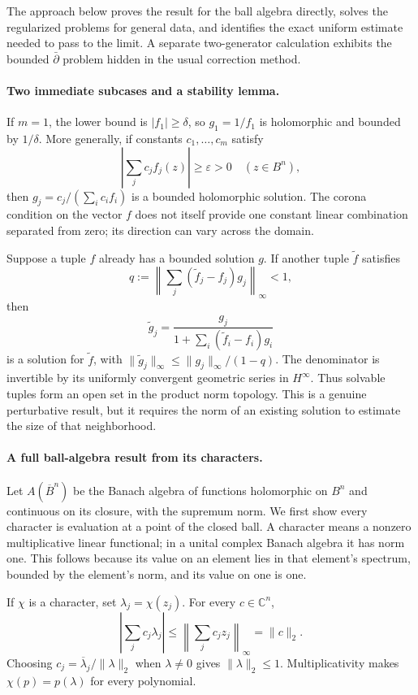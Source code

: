 \documentclass[11pt]{article}
\begin{document}
The approach below proves the result for the ball algebra directly,
solves the regularized problems for general data, and identifies
the exact uniform estimate needed to pass to the limit. A separate
two-generator calculation exhibits the bounded $\bar\partial$
problem hidden in the usual correction method.

\paragraph{Two immediate subcases and a stability lemma.}
If $m=1$, the lower bound is $|f_1|\geq\delta$, so
$g_1=1/f_1$ is holomorphic and bounded by $1/\delta$. More
generally, if constants $c_1,\ldots,c_m$ satisfy
\[
 \left|\sum_j c_jf_j(z)\right|\geq\varepsilon>0
                      \quad(z\in B^n),
\]
then
$g_j=c_j/(\sum_i c_if_i)$ is a bounded holomorphic solution.
The corona condition on the vector $f$ does not itself provide
one constant linear combination separated from zero; its direction
can vary across the domain.

Suppose a tuple $f$ already has a bounded solution $g$. If another
tuple $\widetilde f$ satisfies
\[
 q:=\left\|\sum_j(\widetilde f_j-f_j)g_j\right\|_\infty<1,
\]
then
\[
 \widetilde g_j=
 \frac{g_j}{1+\sum_i(\widetilde f_i-f_i)g_i}
 \tag{371.1}
\]
is a solution for $\widetilde f$, with
$\|\widetilde g_j\|_\infty\leq\|g_j\|_\infty/(1-q)$.
The denominator is invertible by its uniformly convergent geometric
series in $H^\infty$. Thus solvable tuples form an open set in
the product norm topology. This is a genuine perturbative result,
but it requires the norm of an existing solution to estimate the
size of that neighborhood.

\paragraph{A full ball-algebra result from its characters.}
Let $A(\overline B^n)$ be the Banach algebra of functions holomorphic
on $B^n$ and continuous on its closure, with the supremum norm.
We first show every character is evaluation at a point of the
closed ball. A character means a nonzero multiplicative linear
functional; in a unital complex Banach algebra it has norm one.
This follows because its value on an element lies in that
element's spectrum, bounded by the element's norm, and its value
on one is one.

If $\chi$ is a character, set $\lambda_j=\chi(z_j)$. For every
$c\in\mathbb C^n$,
\[
 \left|\sum_jc_j\lambda_j\right|
       \leq\left\|\sum_jc_jz_j\right\|_\infty=\|c\|_2.
\]
Choosing $c_j=\overline\lambda_j/\|\lambda\|_2$ when
$\lambda\ne0$ gives $\|\lambda\|_2\leq1$.
Multiplicativity makes $\chi(p)=p(\lambda)$ for every polynomial.
\end{document}
